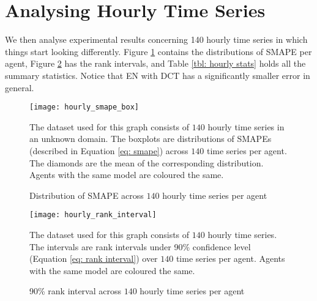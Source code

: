 \section{Analysing Hourly Time Series}
We then analyse experimental results concerning 140 hourly time series in which things start looking differently. Figure \ref{fig: hourly smape box} contains the distributions of SMAPE per agent, Figure \ref{fig: hourly rank interval} has the rank intervals, and Table \ref{tbl: hourly stats} holds all the summary statistics. Notice that EN with DCT has a significantly smaller error in general.
\begin{figure}[H]
    \centering
    \texttt{[image: hourly\_smape\_box]}
    \caption{Distribution of SMAPE across $140$ hourly time series per agent}
    {\raggedright \footnotesize The dataset used for this graph consists of $140$ hourly time series in an unknown domain. The boxplots are distributions of SMAPEs (described in Equation \ref{eq: smape}) across $140$ time series per agent. The diamonds are the mean of the corresponding distribution. Agents with the same model are coloured the same. \par}
    \label{fig: hourly smape box}
\end{figure}
\begin{figure}[H]
    \centering
    \texttt{[image: hourly\_rank\_interval]}
    \caption{90\% rank interval across $140$ hourly time series per agent}
    {\raggedright \footnotesize The dataset used for this graph consists of $140$ hourly time series. The intervals are rank intervals under 90\% confidence level (Equation \ref{eq: rank interval}) over $140$ time series per agent. Agents with the same model are coloured the same. \par}
    \label{fig: hourly rank interval}
\end{figure}
